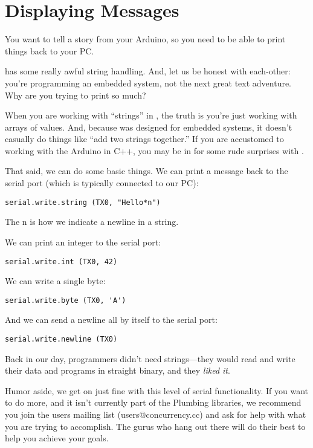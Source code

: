 % 
\section{Displaying Messages}
\problem
You want to tell a story from your Arduino, so you need to be able to print things back to your PC.

\solution
\occam has some really awful string handling. And, let us be honest with each-other: you're programming an embedded system, not the next great text adventure. Why are you trying to print so much?

When you are working with ``strings'' in \occam, the truth is you're just working with arrays of \BYTE values. And, because \occam was designed for embedded systems, it doesn't casually do things like ``add two strings together.'' If you are accustomed to working with the Arduino in C++, you may be in for some rude surprises with \occam. 

That said, we can do some basic things. We can print a message back to the serial port (which is typically connected to our PC):

\begin{lstlisting}
serial.write.string (TX0, "Hello*n")
\end{lstlisting}

The {\code *n} is how we indicate a newline in a string. 

We can print an integer to the serial port:

\begin{lstlisting}
serial.write.int (TX0, 42)
\end{lstlisting}

We can write a single byte:

\begin{lstlisting}
serial.write.byte (TX0, 'A')
\end{lstlisting}

And we can send a newline all by itself to the serial port:

\begin{lstlisting}
serial.write.newline (TX0)
\end{lstlisting}

\discussion
Back in our day, programmers didn't need strings---they would read and write their data and programs in straight binary, and they \emph{liked it}.

Humor aside, we get on just fine with this level of serial functionality. If you want to do more, and it isn't currently part of the Plumbing libraries, we recommend you join the users mailing list ({\code users@concurrency.cc}) and ask for help with what you are trying to accomplish. The \occam gurus who hang out there will do their best to help you achieve your goals.

